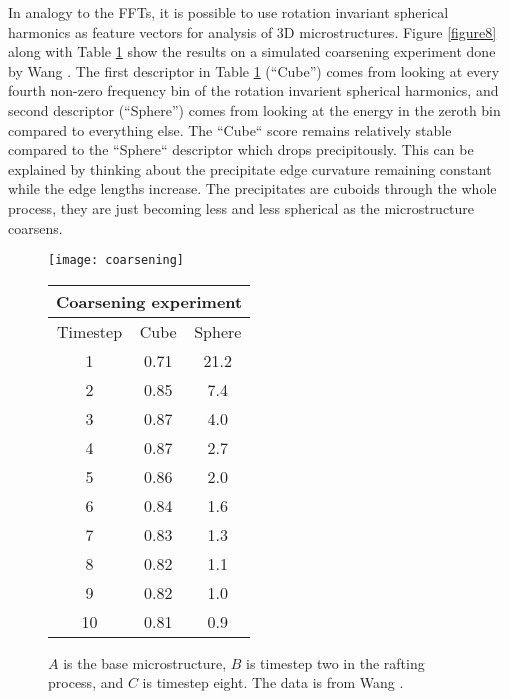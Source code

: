 \documentclass[review]{elsarticle}
\begin{document}
	In analogy to the FFTs, it is possible to use rotation invariant spherical harmonics \cite{spherical} as feature vectors for analysis of 3D microstructures. Figure \ref{figure8} along with Table \ref{table3} show the results on a simulated coarsening experiment done by Wang \cite{ywang2}. The first descriptor in Table \ref{table3} (``Cube'') comes from looking at every fourth non-zero frequency bin of the rotation invarient spherical harmonics, and second descriptor (``Sphere'') comes from looking at the energy in the zeroth bin compared to everything else. The ``Cube`` score remains relatively stable compared to the ``Sphere`` descriptor which drops precipitously. This can be explained by thinking about the precipitate edge curvature remaining constant while the edge lengths increase. The precipitates are cuboids through the whole process, they are just becoming less and less spherical as the microstructure coarsens.
	
	\begin{figure}[!ht]
    	\begin{center}
			\texttt{[image: coarsening]}
	  		\caption{ $A$ is the base microstructure, $B$ is timestep two in the rafting process, and $C$ is timestep eight. The data is from Wang \cite{ywang2}. }
	  		\label{figure8}
  		
			\begin{tabular}{ c | c | c }
				\multicolumn{3}{c}{Coarsening experiment} \\
				\hline
				Timestep & Cube & Sphere \\
				\hline
				1 & 0.71 & 21.2 \\
				2 & 0.85 & 7.4 \\
				3 & 0.87 & 4.0 \\
				4 & 0.87 & 2.7 \\
				5 & 0.86 & 2.0 \\
				6 & 0.84 & 1.6 \\
				7 & 0.83 & 1.3 \\
				8 & 0.82 & 1.1 \\
				9 & 0.82 & 1.0 \\
				10 & 0.81 & 0.9 \\
				\hline
			\end{tabular}
			\label{table3}
		\end{center}
	\end{figure}
	
\end{document}
